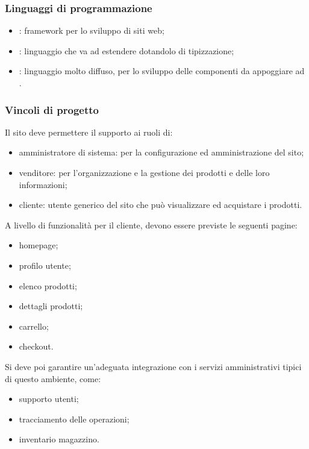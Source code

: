 \documentclass[]{article}
\begin{document}
			\subsubsection{Linguaggi di programmazione}
			\begin{itemize}
				\item {}: framework per lo sviluppo  di siti web;
				\item {}: linguaggio che va ad estendere  dotandolo di tipizzazione;
				\item {}: linguaggio molto diffuso, per lo sviluppo delle componenti  da appoggiare ad .
			\end{itemize}


			\subsubsection{Vincoli di progetto}
			Il sito deve permettere il supporto ai ruoli di:
			\begin{itemize}
			    \item amministratore di sistema: per la configurazione ed amministrazione del sito;
			    \item venditore: per l'organizzazione e la gestione dei prodotti e delle loro informazioni;
			    \item cliente: utente generico del sito che può visualizzare ed acquistare i prodotti.
			\end{itemize}
		A livello di funzionalità per il cliente, devono essere previste le seguenti pagine:
        \begin{itemize}
            \item homepage;
            \item profilo utente;
            \item elenco prodotti;
            \item dettagli prodotti;
            \item carrello;
            \item checkout.
        \end{itemize}
		Si deve poi garantire un'adeguata integrazione con i servizi amministrativi tipici di questo ambiente, come:
        \begin{itemize}
            \item supporto utenti;
            \item tracciamento delle operazioni;
            \item inventario magazzino.
        \end{itemize}
\end{document}
